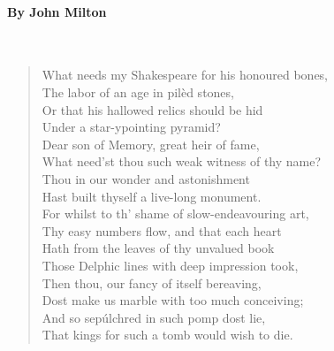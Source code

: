 \documentclass[10pt, letterpaper]{memoir}
\begin{document}
\paragraph{By John Milton}~
\begin{verse}
	What needs my Shakespeare for his honoured bones,\\
	The labor of an age in pilèd stones,\\
	Or that his hallowed relics should be hid\\
	Under a star-ypointing pyramid?\\
	Dear son of Memory, great heir of fame,\\
	What need’st thou such weak witness of thy name?\\
	Thou in our wonder and astonishment\\
	Hast built thyself a live-long monument.\\
	For whilst to th’ shame of slow-endeavouring art,\\
	Thy easy numbers flow, and that each heart\\
	Hath from the leaves of thy unvalued book\\
	Those Delphic lines with deep impression took,\\
	Then thou, our fancy of itself bereaving,\\
	Dost make us marble with too much conceiving;\\
	And so sepúlchred in such pomp dost lie,\\
	That kings for such a tomb would wish to die.
\end{verse}
\end{document}
